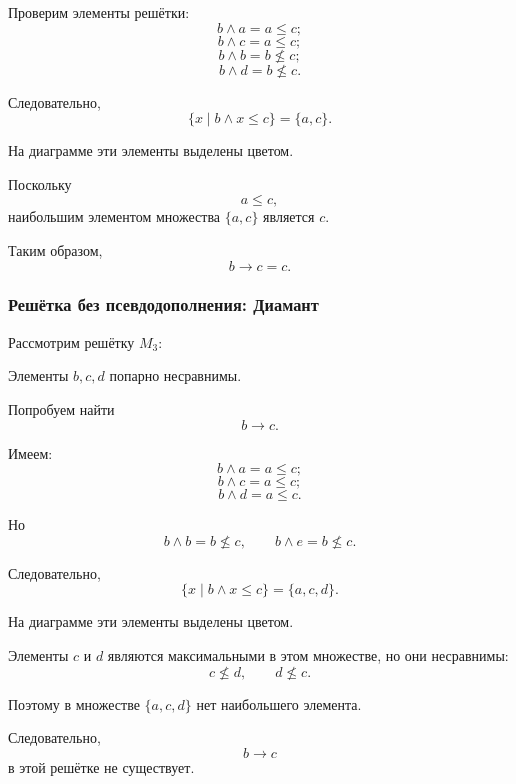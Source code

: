 \documentclass[12pt,a4paper,oneside,openany]{book}
\theoremstyle{definition}
\theoremstyle{plain}
\theoremstyle{remark}
\begin{document}
Проверим элементы решётки:
\[
b\wedge a=a\leq c;
\]
\[
b\wedge c=a\leq c;
\]
\[
b\wedge b=b\nleq c;
\]
\[
b\wedge d=b\nleq c.
\]

Следовательно,
\[
\{x\mid b\wedge x\leq c\}
=
\{a,c\}.
\]

На диаграмме эти элементы выделены цветом.

Поскольку
\[
a\leq c,
\]
наибольшим элементом множества \(\{a,c\}\) является \(c\).

Таким образом,
\[
\boxed{b\to c=c}.
\]

\subsubsection{Решётка без псевдодополнения: Диамант}

Рассмотрим решётку \(M_3\):

\begin{center}
\end{center}

Элементы \(b,c,d\) попарно несравнимы.

Попробуем найти
\[
b\to c.
\]

Имеем:
\[
b\wedge a=a\leq c;
\]
\[
b\wedge c=a\leq c;
\]
\[
b\wedge d=a\leq c.
\]

Но
\[
b\wedge b=b\nleq c,
\qquad
b\wedge e=b\nleq c.
\]

Следовательно,
\[
\{x\mid b\wedge x\leq c\}
=
\{a,c,d\}.
\]

На диаграмме эти элементы выделены цветом.

Элементы \(c\) и \(d\) являются максимальными в этом множестве, но
они несравнимы:
\[
c\nleq d,
\qquad
d\nleq c.
\]

Поэтому в множестве \(\{a,c,d\}\) нет наибольшего элемента.

Следовательно,
\[
b\to c
\]
в этой решётке не существует.
\end{document}
